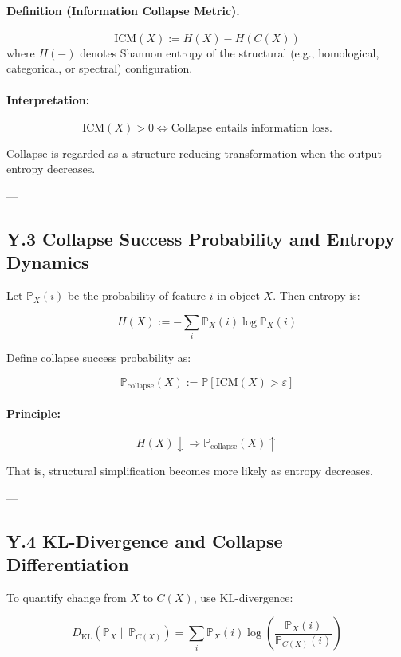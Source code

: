 \documentclass[11pt]{article}
\begin{document}
\paragraph{Definition (Information Collapse Metric).}
\[
\mathrm{ICM}(X) := H(X) - H(C(X))
\]
where \( H(-) \) denotes Shannon entropy of the structural (e.g., homological, categorical, or spectral) configuration.

\paragraph{Interpretation:}
\[
\mathrm{ICM}(X) > 0 \iff \text{Collapse entails information loss.}
\]

Collapse is regarded as a structure-reducing transformation when the output entropy decreases.

---

\subsection*{Y.3 Collapse Success Probability and Entropy Dynamics}

Let \( \mathbb{P}_X(i) \) be the probability of feature \( i \) in object \( X \). Then entropy is:

\[
H(X) := - \sum_{i} \mathbb{P}_X(i) \log \mathbb{P}_X(i)
\]

Define collapse success probability as:

\[
\mathbb{P}_{\mathrm{collapse}}(X) := \mathbb{P}[\mathrm{ICM}(X) > \varepsilon]
\]

\paragraph{Principle:}
\[
H(X) \downarrow \Rightarrow \mathbb{P}_{\mathrm{collapse}}(X) \uparrow
\]

That is, structural simplification becomes more likely as entropy decreases.

---

\subsection*{Y.4 KL-Divergence and Collapse Differentiation}

To quantify change from \( X \) to \( C(X) \), use KL-divergence:

\[
D_{\mathrm{KL}}(\mathbb{P}_X \| \mathbb{P}_{C(X)}) = \sum_{i} \mathbb{P}_X(i) \log \left( \frac{\mathbb{P}_X(i)}{\mathbb{P}_{C(X)}(i)} \right)
\]
\end{document}
